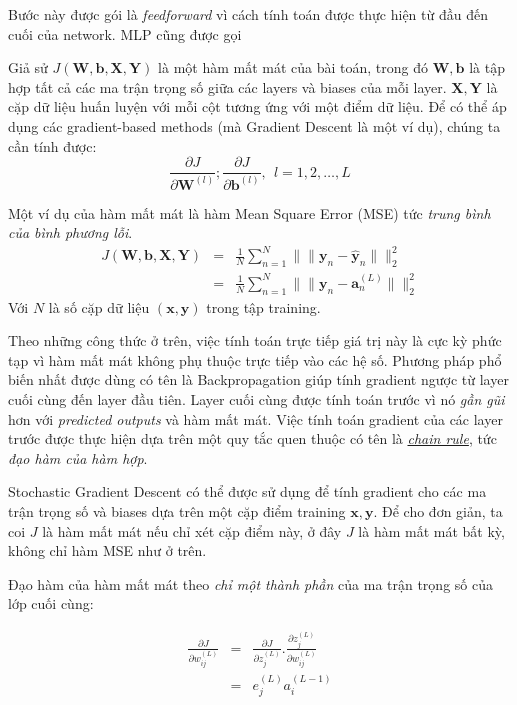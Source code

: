Bước này được gói là \textit{feedforward} vì cách tính toán được thực hiện từ đầu đến cuối của network. MLP cũng được gọi 
 
Giả sử $J(\mathbf{W, b, X, Y})$ là một hàm mất mát của bài toán, trong đó $\mathbf{W, b}$ là tập hợp tất cả các ma trận trọng số giữa các layers và biases của mỗi layer. $\mathbf{X, Y}$ là cặp dữ liệu huấn luyện với mỗi cột tương ứng với một điểm dữ liệu. Để có thể áp dụng các gradient-based methods (mà Gradient Descent là một ví dụ), chúng ta cần tính được: 
\begin{equation*} 
\frac{\partial J}{\partial \mathbf{W}^{(l)}} ; \frac{\partial J}{\partial \mathbf{b}^{(l)}},~~ l = 1, 2, \dots, L 
\end{equation*} 
 
Một ví dụ của hàm mất mát là hàm Mean Square Error (MSE) tức \textit{trung bình của bình phương lỗi}. 
\begin{equation*} 
\begin{eqnarray} 
J(\mathbf{W, b, X, Y}) &=& \frac{1}{N}\sum_{n=1}^N \|\| \mathbf{y}_n - \mathbf{\hat{y}}_n\|\|_2^2 \\\ 
&=&\frac{1}{N}\sum_{n=1}^N \|\| \mathbf{y}_n - \mathbf{a}_n^{(L)}\|\|_2^2 
\end{eqnarray} 
\end{equation*} 
Với $N$ là số cặp dữ liệu $(\mathbf{x}, \mathbf{y})$ trong tập training. 
 
Theo những công thức ở trên, việc tính toán trực tiếp giá trị này là cực kỳ phức tạp vì hàm mất mát không phụ thuộc trực tiếp vào các hệ số. Phương pháp phổ biến nhất được dùng có tên là Backpropagation giúp tính gradient ngược từ layer cuối cùng đến layer đầu tiên. Layer cuối cùng được tính toán trước vì nó \textit{gần gũi} hơn với \textit{predicted outputs} và hàm mất mát. Việc tính toán gradient của các layer trước được thực hiện dựa trên một quy tắc quen thuộc có tên là \href{https://en.wikipedia.org/wiki/Chain_rule}{\textit{chain rule}}, tức \textit{đạo hàm của hàm hợp}. 
 
Stochastic Gradient Descent có thể được sử dụng để tính gradient cho các ma trận trọng số và biases dựa trên một cặp điểm training $\mathbf{x, y}$. Để cho đơn giản, ta coi $J$ là hàm mất mát nếu chỉ xét cặp điểm này, ở đây $J$ là hàm mất mát bất kỳ, không chỉ hàm MSE như ở trên. 
 
Đạo hàm của hàm mất mát theo \textit{chỉ một thành phần} của ma trận trọng số của lớp cuối cùng: 
 
\begin{equation*} 
\begin{eqnarray} 
\frac{\partial J}{\partial w_{ij}^{(L)}} &=& \frac{\partial J}{\partial z_j^{(L)}}. \frac{\partial z_j^{(L)}}{\partial w_{ij}^{(L)}} \\\ 
&=& e_j^{(L)} a_i^{(L-1)} 
\end{eqnarray} 
\end{equation*} 
 
